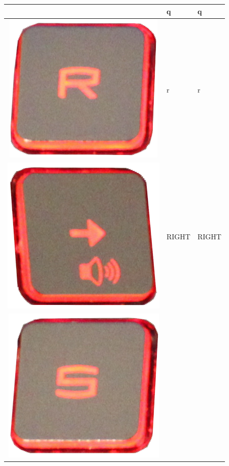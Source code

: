 \begin{longtable}{|cll|}
\begin{minipage}[c]{.3\textwidth}
\vspace{0.2cm}
\end{minipage} & q & q\\
\hline
\begin{minipage}[c]{.3\textwidth}
\vspace{0.2cm}
\includegraphics[scale=0.06]{Images/KeyMapping/r}
\vspace{0.2cm}
\end{minipage} & r & r\\
\hline
\begin{minipage}[c]{.3\textwidth}
\vspace{0.2cm}
\includegraphics[scale=0.06]{Images/KeyMapping/RIGHT}
\vspace{0.2cm}
\end{minipage} & RIGHT & RIGHT\\
\hline
\begin{minipage}[c]{.3\textwidth}
\vspace{0.2cm}
\includegraphics[scale=0.06]{Images/KeyMapping/s}

\end{minipage}
\end{longtable}
